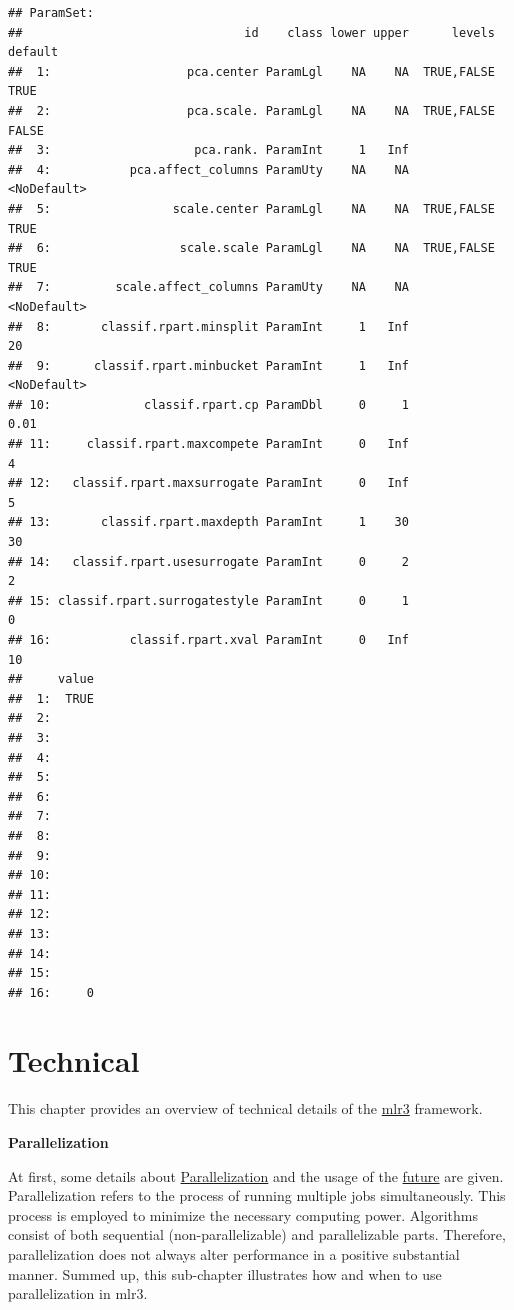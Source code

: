 \documentclass[]{scrbook}
\begin{document}
\begin{verbatim}
## ParamSet: 
##                               id    class lower upper      levels     default
##  1:                   pca.center ParamLgl    NA    NA  TRUE,FALSE        TRUE
##  2:                   pca.scale. ParamLgl    NA    NA  TRUE,FALSE       FALSE
##  3:                    pca.rank. ParamInt     1   Inf                        
##  4:           pca.affect_columns ParamUty    NA    NA             <NoDefault>
##  5:                 scale.center ParamLgl    NA    NA  TRUE,FALSE        TRUE
##  6:                  scale.scale ParamLgl    NA    NA  TRUE,FALSE        TRUE
##  7:         scale.affect_columns ParamUty    NA    NA             <NoDefault>
##  8:       classif.rpart.minsplit ParamInt     1   Inf                      20
##  9:      classif.rpart.minbucket ParamInt     1   Inf             <NoDefault>
## 10:             classif.rpart.cp ParamDbl     0     1                    0.01
## 11:     classif.rpart.maxcompete ParamInt     0   Inf                       4
## 12:   classif.rpart.maxsurrogate ParamInt     0   Inf                       5
## 13:       classif.rpart.maxdepth ParamInt     1    30                      30
## 14:   classif.rpart.usesurrogate ParamInt     0     2                       2
## 15: classif.rpart.surrogatestyle ParamInt     0     1                       0
## 16:           classif.rpart.xval ParamInt     0   Inf                      10
##     value
##  1:  TRUE
##  2:      
##  3:      
##  4:      
##  5:      
##  6:      
##  7:      
##  8:      
##  9:      
## 10:      
## 11:      
## 12:      
## 13:      
## 14:      
## 15:      
## 16:     0
\end{verbatim}

\hypertarget{technical}{%
\chapter{Technical}\label{technical}}

This chapter provides an overview of technical details of the \href{https://mlr3.mlr-org.com}{mlr3} framework.

\textbf{Parallelization}

At first, some details about \protect\hyperlink{parallelization}{Parallelization} and the usage of the \href{https://cran.r-project.org/package=future}{future} are given.
Parallelization refers to the process of running multiple jobs simultaneously.
This process is employed to minimize the necessary computing power.
Algorithms consist of both sequential (non-parallelizable) and parallelizable parts.
Therefore, parallelization does not always alter performance in a positive substantial manner.
Summed up, this sub-chapter illustrates how and when to use parallelization in mlr3.
\end{document}
